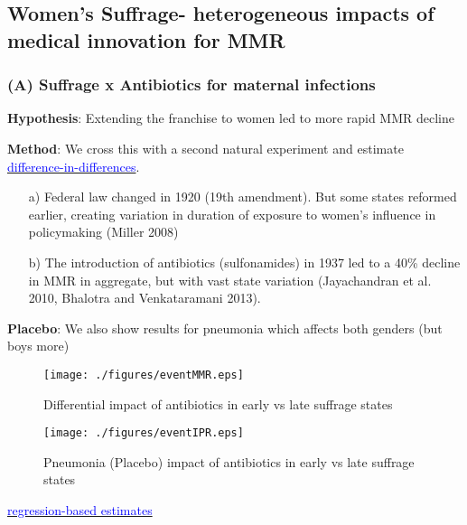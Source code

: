 \documentclass[9pt,letterpaper,subeqn]{beamer}
\begin{document}
\subsection{Women's Suffrage- heterogeneous impacts of medical innovation for MMR}
\begin{frame}[label=USAHistory]
\frametitle{(A) Suffrage x Antibiotics for maternal infections}
\textbf{Hypothesis}: Extending the franchise to women led to more rapid MMR decline \\
\vspace{3mm}

\textbf{Method}: We cross this with a second natural experiment and estimate \hyperlink{sulfDD}{\textcolor{blue}{difference-in-differences}}.
\begin{enumerate}
\item[a)] Federal law changed in 1920 (19th amendment). But some states reformed earlier, creating variation in duration of exposure to women's influence in policymaking (Miller 2008)
\item[b)] The introduction of antibiotics (sulfonamides) in 1937 led to a 40\% decline in MMR in aggregate, but with vast state variation (Jayachandran et al. 2010, Bhalotra and Venkataramani 2013).
\end{enumerate}
\vspace{3mm}
\textbf{Placebo}: We also show results for pneumonia which affects both genders (but boys more)%
\end{frame}


\begin{frame}[label=MMREvent,plain]
\begin{figure}
\caption{Differential impact of antibiotics in early vs late suffrage states}
\texttt{[image: ./figures/eventMMR.eps]}
\end{figure}
\end{frame}


\begin{frame}[label=IPREvent,plain]
\begin{figure}
\caption{Pneumonia (Placebo) impact of antibiotics in early vs late suffrage states}
\texttt{[image: ./figures/eventIPR.eps]}
\end{figure}
\hyperlink{DDreg}{\textcolor{blue}{regression-based estimates}}
\end{frame}
\end{document}
